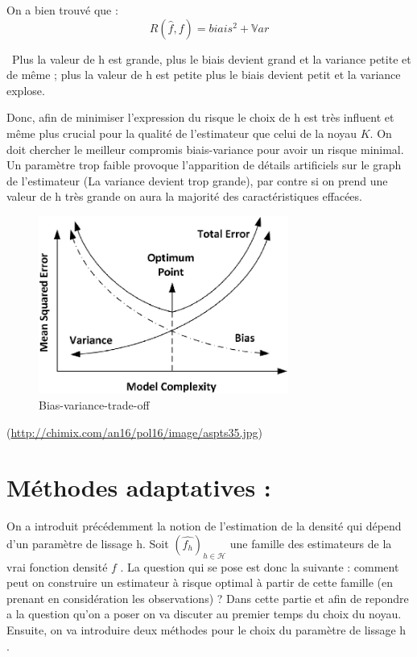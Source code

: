 \documentclass[
]{book}
\begin{document}
On a bien trouvé que :
\[R(\hat{f},f)=biais^2+\mathbb Var\]

\begin{rem}\
   Plus la  valeur de h est grande, plus le biais devient grand et la variance petite et de même ;  
   plus la valeur de h est petite plus le biais devient petit et la variance explose.\newline
\end{rem}

Donc, afin de minimiser l'expression du risque le choix de h est très influent et même plus crucial pour la qualité de l'estimateur que celui de la noyau \(K\).\newline
On doit chercher le meilleur compromis biais-variance pour avoir un risque minimal.\newline
Un paramètre trop faible provoque l'apparition de détails artificiels sur le graph de l'estimateur (La variance devient trop grande), par contre si on prend une valeur de h très grande on aura la majorité des caractéristiques effacées.\newline

\hspace*{4cm}

\begin{figure}
\centering
\includegraphics[width=3.22917in,height=\textheight]{Images/Bias_variance_trade_off.png}
\caption{Bias-variance-trade-off}
\end{figure}

(\url{http://chimix.com/an16/pol16/image/aspts35.jpg})

\hypertarget{muxe9thodes-adaptatives}{%
\chapter{Méthodes adaptatives :}\label{muxe9thodes-adaptatives}}

\hspace*{0.5cm} On a introduit précédemment la notion de l'estimation de la densité qui dépend d'un paramètre de lissage h. Soit \((\hat{f_h})_{h\in \mathcal H}\) une famille des estimateurs de la vrai fonction densité \(f\) .\newline
La question qui se pose est donc la suivante : comment peut on construire un estimateur à risque optimal à partir de cette famille (en prenant en considération les observations) ? \newline
\hspace*{0.5cm} Dans cette partie et afin de repondre a la question qu'on a poser on va discuter au premier temps du choix du noyau. Ensuite, on va introduire deux méthodes pour le choix du paramètre de lissage h .
\end{document}
